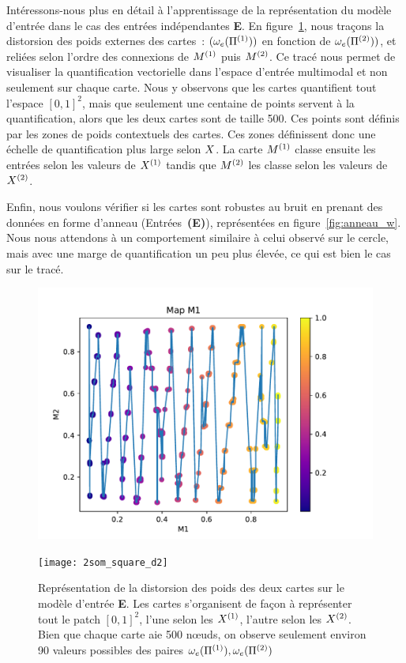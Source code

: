 \documentclass[../main]{subfiles}
\begin{document}
Intéressons-nous plus en détail à l'apprentissage de la représentation du modèle d'entrée dans le cas des entrées indépendantes \textbf{E}.
En figure~\ref{fig:2som_p_d}, nous traçons la distorsion des poids externes des cartes~: $(\omega_e(\Pi^{({1})}))$ en fonction de  $\omega_e(\Pi^{({2})}))$, et reliées selon l'ordre des connexions de $M^{({1})}$ puis $M^{({2})}$.
Ce tracé nous permet de visualiser la quantification vectorielle dans l'espace d'entrée multimodal et non seulement sur chaque carte. Nous y observons que les cartes quantifient tout l'espace $[0,1]^2$, mais que seulement une centaine de points servent à la quantification, alors que les deux cartes sont de taille 500. 
Ces points sont définis par les zones de poids contextuels des cartes. Ces zones définissent donc une échelle de quantification plus large selon $X$.
La carte $M^{({1})}$ classe ensuite les entrées selon les valeurs de $X^{({1})}$ tandis que $M^{({2})}$ les classe selon les valeurs de $X^{({2})}$. 

Enfin, nous voulons vérifier si les cartes sont robustes au bruit en prenant des données en forme d'anneau (Entrées~\textbf{(E)}), représentées en figure~\ref{fig:anneau_w}. Nous nous attendons à un comportement similaire à celui observé sur le cercle, mais avec une marge de quantification un peu plus élevée, ce qui est bien le cas sur le tracé.

\begin{figure}[H]
	\hfill\begin{minipage}{0.4\textwidth}
		\includegraphics[width=\textwidth]{2som_square_d}
	\end{minipage}
	\begin{minipage}{0.4\textwidth}
		\texttt{[image: 2som\_square\_d2]}
	\end{minipage}\hfill
	\caption{Représentation de la distorsion des poids des deux cartes sur le modèle d'entrée \textbf{E}. Les cartes s'organisent de façon à représenter tout le patch $[0,1]^2$, l'une selon les $X^{({1})}$, l'autre selon les $X^{({2})}$. Bien que chaque carte aie 500 n\oe{}uds, on observe seulement environ 90 valeurs possibles des paires $\omega_e(\Pi^{({1})}),\omega_e(\Pi^{({2})})$ \label{fig:2som_p_d}}
\end{figure}
\end{document}
